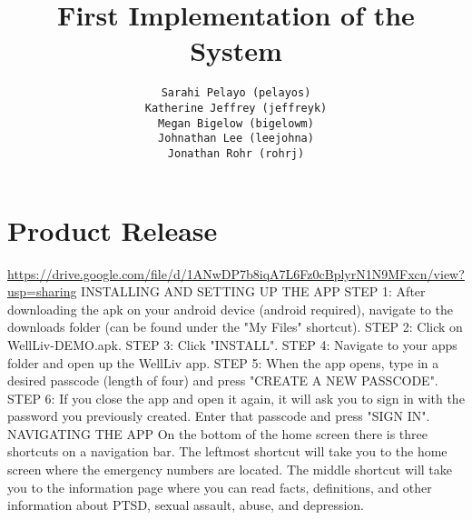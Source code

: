 \documentclass[letterpaper,12pt,titlepage]{article}
\title{First Implementation of the System}
\author{
  \texttt{Sarahi Pelayo (pelayos)}
  \\[.5ex]
  \texttt{Katherine Jeffrey (jeffreyk)}
  \\[.5ex]
  \texttt{Megan Bigelow (bigelowm)}
  \\[.5ex]
  \texttt{Johnathan Lee (leejohna)}
  \\[.5ex]
  \texttt{Jonathan Rohr (rohrj)}
}
\begin{document}
\maketitle

\section{Product Release}

\underline{https://drive.google.com/file/d/1ANwDP7b8iqA7L6Fz0cBplyrN1N9MFxcn/view?usp=sharing}
\newline
\newline
INSTALLING AND SETTING UP THE APP
\newline
\newline
STEP 1: After downloading the apk on your android device (android required), navigate to the downloads folder (can be found under the "My Files" shortcut).
\newline
\newline
STEP 2: Click on WellLiv-DEMO.apk.
\newline
\newline
STEP 3: Click "INSTALL".
\newline
\newline
STEP 4: Navigate to your apps folder and open up the WellLiv app.
\newline
\newline
STEP 5: When the app opens, type in a desired passcode (length of four) and press "CREATE A NEW PASSCODE".
\newline
\newline
STEP 6: If you close the app and open it again, it will ask you to sign in with the password you previously created. Enter that passcode and press "SIGN IN".
\newline
\newline
NAVIGATING THE APP
\newline
\newline
On the bottom of the home screen there is three shortcuts on a navigation bar.
\newline
\newline
The leftmost shortcut will take you to the home screen where the emergency numbers are located.
\newline
\newline
The middle shortcut will take you to the information page where you can read facts, definitions, and other information about PTSD, sexual assault, abuse, and depression.
\newline
\end{document}
